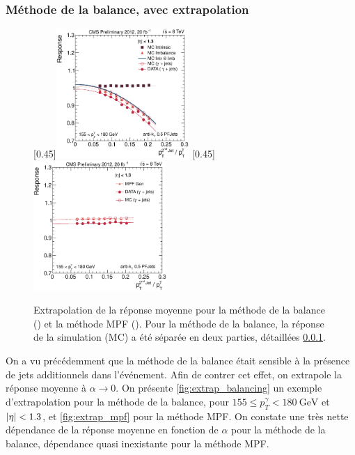 \clearpage

\subsubsection{Méthode de la balance, avec extrapolation} \label{sec:res_balancing_extrap}

\begin{figure}[tbp]
    \centering
    \subcaptionbox{\label{fig:extrap_balancing}}[0.45\textwidth]{\includegraphics[width=0.45\textwidth]{chapitre4/figs/extrap/response_eta013_ptPhot_155_180.eps}}\hfill
    \subcaptionbox{\label{fig:extrap_mpf}}[0.45\textwidth]{\includegraphics[width=0.45\textwidth]{chapitre4/figs/extrap/responseMPF_eta013_ptPhot_155_180.eps}}
    \caption{Extrapolation de la réponse moyenne pour la méthode de la balance () et la méthode MPF (). Pour la méthode de la balance, la réponse de la simulation (MC) a été séparée en deux parties, détaillées \cref{sec:res_balancing_extrap}.}
\end{figure}

On a vu précédemment que la méthode de la balance était sensible à la présence de jets additionnels dans l'événement. Afin de contrer cet effet, on extrapole la réponse moyenne à $\alpha \rightarrow 0$. On présente \cref{fig:extrap_balancing} un exemple d'extrapolation pour la méthode de la balance, pour $155 \leq p_T^\gamma < \SI{180}{\GeV}$ et $\lvert \eta \rvert < \num{1.3}$, et \cref{fig:extrap_mpf} pour la méthode MPF. On constate une très nette dépendance de la réponse moyenne en fonction de $\alpha$ pour la méthode de la balance, dépendance quasi inexistante pour la méthode MPF.

